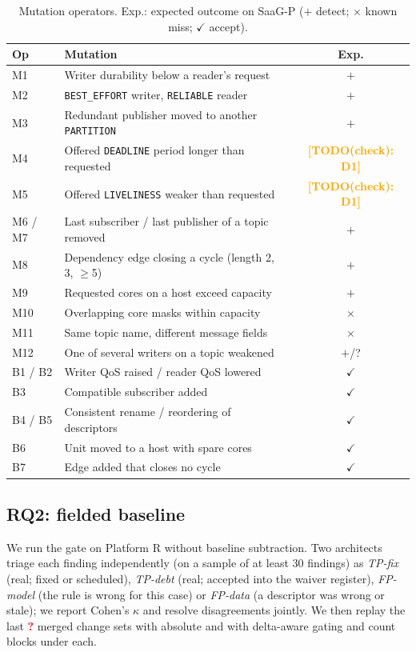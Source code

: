 \documentclass[sigconf,screen]{acmart}
\newcommand{\TODOcheck}[1]{\textcolor{orange}{\textbf{[TODO(check): #1]}}}
\newcommand{\tbd}{\textcolor{red}{\textbf{?}}}
\begin{document}
\begin{table}[t]
\centering
\caption{Mutation operators. Exp.: expected outcome on SaaG-P ($+$ detect; $\times$ known miss; $\checkmark$ accept).}
\label{tab:mutants}
\small
\begin{tabularx}{\columnwidth}{l Y c}
\toprule
Op & Mutation & Exp. \\
\midrule
M1 & Writer durability below a reader's request & $+$ \\
M2 & \texttt{BEST\_EFFORT} writer, \texttt{RELIABLE} reader & $+$ \\
M3 & Redundant publisher moved to another \texttt{PARTITION} & $+$ \\
M4 & Offered \texttt{DEADLINE} period longer than requested & \TODOcheck{D1} \\
M5 & Offered \texttt{LIVELINESS} weaker than requested & \TODOcheck{D1} \\
M6 / M7 & Last subscriber / last publisher of a topic removed & $+$ \\
M8 & Dependency edge closing a cycle (length 2, 3, $\ge$5) & $+$ \\
M9 & Requested cores on a host exceed capacity & $+$ \\
M10 & Overlapping core masks within capacity & $\times$ \\
M11 & Same topic name, different message fields & $\times$ \\
M12 & One of several writers on a topic weakened & $+$/? \\
\midrule
B1 / B2 & Writer QoS raised / reader QoS lowered & $\checkmark$ \\
B3 & Compatible subscriber added & $\checkmark$ \\
B4 / B5 & Consistent rename / reordering of descriptors & $\checkmark$ \\
B6 & Unit moved to a host with spare cores & $\checkmark$ \\
B7 & Edge added that closes no cycle & $\checkmark$ \\
\bottomrule
\end{tabularx}
\end{table}

\subsection{RQ2: fielded baseline}
We run the gate on Platform R without baseline subtraction. Two architects triage each finding independently (on a sample of at least 30 findings) as \emph{TP-fix} (real; fixed or scheduled), \emph{TP-debt} (real; accepted into the waiver register), \emph{FP-model} (the rule is wrong for this case) or \emph{FP-data} (a descriptor was wrong or stale); we report Cohen's $\kappa$ and resolve disagreements jointly. We then replay the last \tbd{} merged change sets with absolute and with delta-aware gating and count blocks under each.
\end{document}
